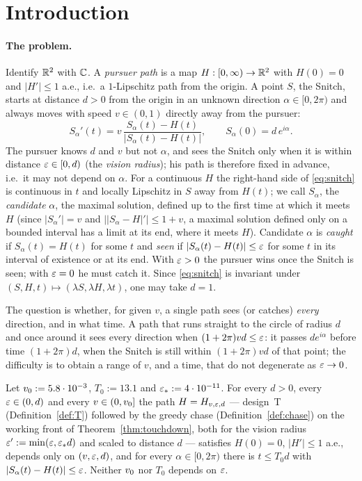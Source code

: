 \section{Introduction}\label{sec:intro}

\paragraph{The problem.} Identify $\mathbb{R}^2$ with $\mathbb{C}$. A \emph{pursuer path} is a map $H:[0,\infty)\to\mathbb{R}^2$ with $H(0)=0$ and
$|H'|\le1$ a.e., i.e.\ a $1$-Lipschitz path from the origin. A point $S$, the Snitch, starts at distance $d>0$ from the origin in
an unknown direction $\alpha\in[0,2\pi)$ and always moves with speed $v\in(0,1)$ directly away from the pursuer:
\begin{equation}\label{eq:snitch}
S_\alpha'(t)=v\,\frac{S_\alpha(t)-H(t)}{|S_\alpha(t)-H(t)|},\qquad S_\alpha(0)=d\,e^{i\alpha}.
\end{equation}
The pursuer knows $d$ and $v$ but not $\alpha$, and sees the Snitch only when it is within distance $\varepsilon\in[0,d)$ (the
\emph{vision radius}); his path is therefore fixed in advance, i.e.\ it may not depend on $\alpha$. For a continuous $H$ the
right-hand side of \eqref{eq:snitch} is continuous in $t$ and locally Lipschitz in $S$ away from $H(t)$; we call $S_\alpha$, the
\emph{candidate} $\alpha$, the maximal solution, defined up to the first time at which it meets $H$ (since $|S_\alpha'|=v$ and
$\bigl||S_\alpha-H|'\bigr|\le1+v$, a maximal solution defined only on a bounded interval has a limit at its end, where it meets
$H$). Candidate $\alpha$ is \emph{caught} if $S_\alpha(t)=H(t)$ for some $t$ and \emph{seen} if $|S_\alpha(t)-H(t)|\le\varepsilon$ for
some $t$ in its interval of existence or at its end. With $\varepsilon>0$ the pursuer wins once the Snitch is seen; with $\varepsilon=0$ he
must catch it. Since \eqref{eq:snitch} is invariant under $(S,H,t)\mapsto(\lambda S,\lambda H,\lambda t)$, one may take $d=1$.

The question is whether, for given $v$, a single path sees (or catches) \emph{every} direction, and in what time. A path that
runs straight to the circle of radius $d$ and once around it sees every direction when $(1+2\pi)vd\le\varepsilon$: it passes $de^{i\alpha}$ before time $(1+2\pi)d$, when the Snitch is still within $(1+2\pi)vd$ of that point; the difficulty is to obtain a range of
$v$, and a time, that do not degenerate as $\varepsilon\to0$.

\begin{theorem}\label{thm:main}
Let $v_0:=5.8\cdot10^{-3}$, $T_0:=13.1$ and $\varepsilon_*:=4\cdot10^{-11}$. For every $d>0$, every $\varepsilon\in(0,d)$ and every
$v\in(0,v_0]$ the path $H=H_{v,\varepsilon,d}$ --- design~T \textup{(Definition~\ref{def:T})} followed by the greedy chase
\textup{(Definition~\ref{def:chase})} on the working front of Theorem~\ref{thm:touchdown}, both for the vision radius
$\varepsilon':=\min(\varepsilon,\varepsilon_* d)$ and scaled to distance $d$ --- satisfies $H(0)=0$, $|H'|\le1$ a.e., depends only on $(v,\varepsilon,d)$, and
for every $\alpha\in[0,2\pi)$ there is $t\le T_0d$ with $|S_\alpha(t)-H(t)|\le\varepsilon$. Neither $v_0$ nor $T_0$ depends on $\varepsilon$.
\end{theorem}


